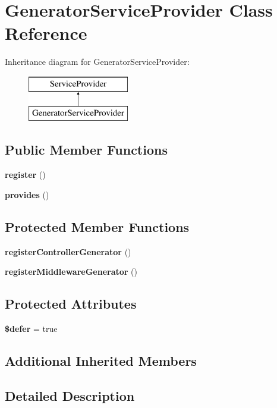 \section{Generator\+Service\+Provider Class Reference}
\label{class_illuminate_1_1_routing_1_1_generator_service_provider}
Inheritance diagram for Generator\+Service\+Provider\+:\begin{figure}[H]
\begin{center}
\leavevmode
\includegraphics[height=2.000000cm]{class_illuminate_1_1_routing_1_1_generator_service_provider}
\end{center}
\end{figure}
\subsection*{Public Member Functions}
\begin{DoxyCompactItemize}
\item 
{\bf register} ()
\item 
{\bf provides} ()
\end{DoxyCompactItemize}
\subsection*{Protected Member Functions}
\begin{DoxyCompactItemize}
\item 
{\bf register\+Controller\+Generator} ()
\item 
{\bf register\+Middleware\+Generator} ()
\end{DoxyCompactItemize}
\subsection*{Protected Attributes}
\begin{DoxyCompactItemize}
\item 
{\bf \$defer} = true
\end{DoxyCompactItemize}
\subsection*{Additional Inherited Members}


\subsection{Detailed Description}


